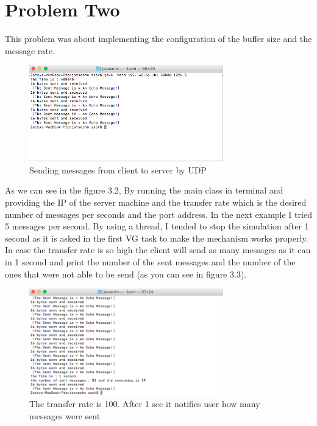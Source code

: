 \documentclass[a4paper,12pt]{article}
\begin{document}
\newpage



\section {Problem Two}
This problem was about implementing the configuration of the buffer size and the message rate. 
\begin{figure}[h]
    \centering
    \includegraphics[width=0.75\textwidth]{figure2}
    \caption{Sending messages from client to server by UDP}
    \label{fig:figure2}
\end{figure}

As we can see in the figure 3.2, By running the main class in terminal and providing the IP of the server machine and the transfer rate which is the desired number of messages per seconds and the port address. In the next example I tried 5 messages per second. By using a thread, I tended to stop the simulation after 1 second as it is asked in the first VG task to make the mechanism works properly. In case the transfer rate is so high the client will send as many messages as it can in 1 second and print the number of the sent messages and the 
number of the ones that were not able to be send (as you can see in figure 3.3). 
\begin{figure}[h]
    \centering
    \includegraphics[width=0.75\textwidth]{figure3}
    \caption{The transfer rate is 100. After 1 sec it notifies user how many messages were sent}
    \label{}
\end{figure}
\end{document}
